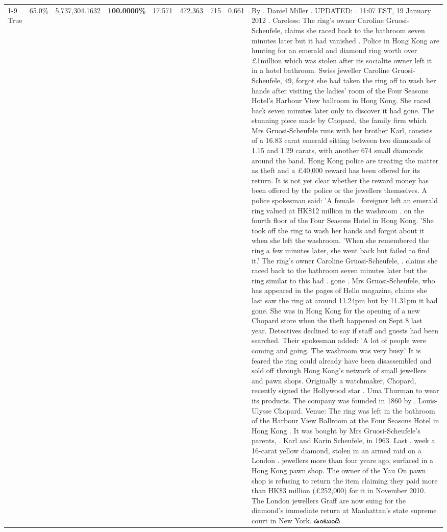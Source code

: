 \begin{table}[H]
\begin{tabular}{lllrlllll}
\cline{1-9}
True & 65.0\% & 5,737,304.1632 & \bfseries \color{red} 100.0000\% & 17.571 & 472.363 & 715 & 0.661 & By . Daniel Miller . UPDATED: . 11:07 EST, 19 January 2012 . Careless: The ring's owner Caroline Gruosi-Scheufele, claims she raced back to the bathroom seven minutes later but it had vanished . Police in Hong Kong are hunting for an emerald and diamond ring worth over £1million which was stolen after its socialite owner left it in a hotel bathroom. Swiss jeweller Caroline Gruosi-Scheufele, 49, forgot she had taken the ring off to wash her hands after visiting the ladies' room of the Four Seasons Hotel's Harbour View ballroom in Hong Kong. She raced back seven minutes later only to discover it had gone. The stunning piece made by Chopard, the family firm which Mrs Gruosi-Scheufele runs with her brother Karl, consists of a 16.83 carat emerald sitting between two diamonds of 1.15 and 1.29 carats, with another 674 small diamonds around the band. Hong Kong police are treating the matter as theft and a £40,000 reward has been offered for its return. It is not yet clear whether the reward money has been offered by the police or the jewellers themselves. A police spokesman said: 'A female . foreigner left an emerald ring valued at HK\$12 million in the washroom . on the fourth floor of the Four Seasons Hotel in Hong Kong. 'She took off the ring to wash her hands and forgot about it when she left the washroom. 'When she remembered the ring a few minutes later, she went back but failed to find it.' The ring's owner Caroline Gruosi-Scheufele, . claims she raced back to the bathroom seven minutes later but the ring similar to this had . gone . Mrs Gruosi-Scheufele, who has appeared in the pages of Hello magazine, claims she last saw the ring at around 11.24pm but by 11.31pm it had gone. She was in Hong Kong for the opening of a new Chopard store when the theft happened on Sept 8 last year. Detectives declined to say if staff and guests had been searched. Their spokesman added: 'A lot of people were coming and going. The washroom was very busy.' It is feared the ring could already have been disassembled and sold off through Hong Kong's network of small jewellers and pawn shops. Originally a watchmaker, Chopard, recently signed the Hollywood star . Uma Thurman to wear its products. The company was founded in 1860 by . Louis-Ulysse Chopard. Venue: The ring was left in the bathroom of the Harbour View Ballroom at the Four Seasons Hotel in Hong Kong . It was bought by Mrs Gruosi-Scheufele's  parents, . Karl and Karin Scheufele, in 1963. Last . week a 16-carat yellow diamond, stolen in an armed raid on a London . jewellers more than four years ago, surfaced in a Hong Kong pawn shop. The owner of the Yau On pawn shop is refusing to return the item claiming they paid more than HK\$3 million (£252,000) for it in November 2010. The London jewellers Graff are now suing for the diamond’s immediate return at Manhattan’s state supreme court in New York. ఉంటుంది \\

\end{tabular}
\end{table}
